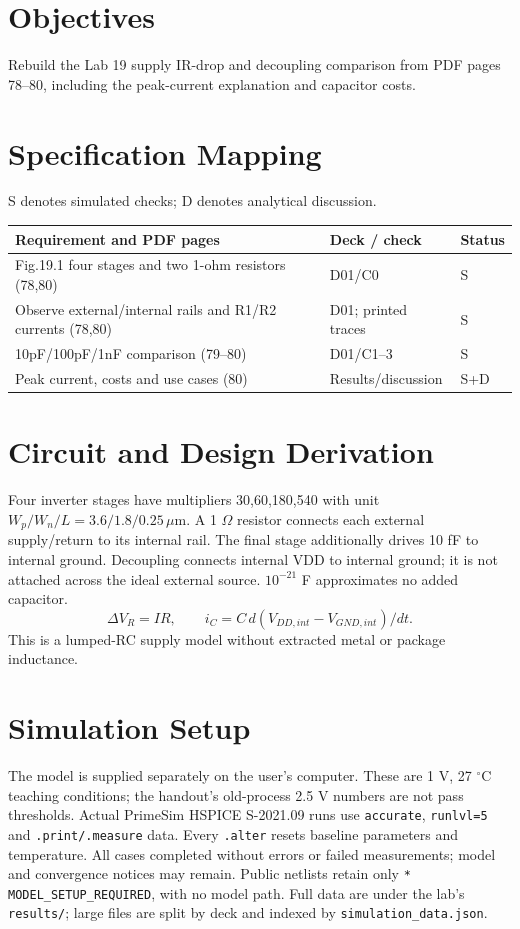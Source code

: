 \section{Objectives}
Rebuild the Lab 19 supply IR-drop and decoupling comparison from PDF pages 78--80, including the peak-current explanation and capacitor costs.

\section{Specification Mapping}
S denotes simulated checks; D denotes analytical discussion.

\small\begin{longtable}{p{.46\linewidth}p{.30\linewidth}p{.15\linewidth}}\toprule
Requirement and PDF pages & Deck / check & Status \\ \midrule\endhead
Fig.19.1 four stages and two 1-ohm resistors (78,80) & D01/C0 & S \\
Observe external/internal rails and R1/R2 currents (78,80) & D01; printed traces & S \\
10pF/100pF/1nF comparison (79--80) & D01/C1--3 & S \\
Peak current, costs and use cases (80) & Results/discussion & S+D \\
\bottomrule\end{longtable}\normalsize


\section{Circuit and Design Derivation}
Four inverter stages have multipliers 30,60,180,540 with unit $W_p/W_n/L=3.6/1.8/0.25\,\mu$m. A 1 $\Omega$ resistor connects each external supply/return to its internal rail. The final stage additionally drives 10 fF to internal ground. Decoupling connects internal VDD to internal ground; it is not attached across the ideal external source. $10^{-21}$ F approximates no added capacitor.
\[\Delta V_R=IR,\qquad i_C=C\,d(V_{DD,int}-V_{GND,int})/dt.\]
This is a lumped-RC supply model without extracted metal or package inductance.

\section{Simulation Setup}
The model is supplied separately on the user's computer. These are 1 V, 27 $^\circ$C teaching conditions; the handout's old-process 2.5 V numbers are not pass thresholds. Actual PrimeSim HSPICE S-2021.09 runs use \texttt{accurate}, \texttt{runlvl=5} and \texttt{.print/.measure} data. Every \texttt{.alter} resets baseline parameters and temperature. All cases completed without errors or failed measurements; model and convergence notices may remain. Public netlists retain only \texttt{* MODEL\_SETUP\_REQUIRED}, with no model path. Full data are under the lab's \texttt{results/}; large files are split by deck and indexed by \texttt{simulation\_data.json}.

